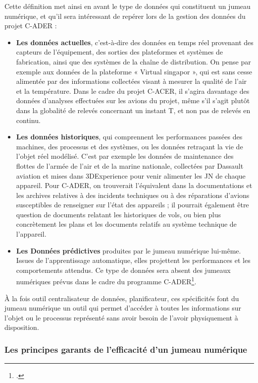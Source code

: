 Cette définition met ainsi en avant le type de données qui constituent un jumeau numérique, et qu'il sera intéressant de repérer lors de la gestion des données du projet C-ADER : 
\begin{itemize}
    \item \textbf{Les données actuelles}, c’est-à-dire des données en temps réel provenant des capteurs de l’équipement, des sorties des plateformes et systèmes de fabrication, ainsi que des systèmes de la chaîne de distribution. On pense par exemple aux données de la plateforme « Virtual singapor », qui est sans cesse alimentée par des informations collectées visant à mesurer la qualité de l’air et la température. Dans le cadre du projet C-ACER, il s’agira davantage des données d’analyses effectuées sur les avions du projet, même s’il s’agit plutôt dans la globalité de relevés concernant un instant T, et non pas de relevés en continu. 
    \item \textbf{Les données historiques}, qui comprennent les performances passées des machines, des processus et des systèmes, ou les données retraçant la vie de l’objet réel modélisé. C’est par exemple les données de maintenance des flottes de l’armée de l’air et de la marine nationale, collectées par Dassault aviation et mises dans 3DExperience pour venir alimenter les JN de chaque appareil. Pour C-ADER, on trouverait l’équivalent dans la documentations et les archives relatives à des incidents techniques ou à des réparations d’avions susceptibles de renseigner sur l’état des appareils ; il pourrait également être question de documents relatant les historiques de vols, ou bien plus concrètement les plans et les documents relatifs au système technique de l’appareil.
    \item \textbf{Les Données prédictives} produites par le jumeau numérique lui-même. Issues de l'apprentissage automatique, elles projettent les performances et les comportements attendus. Ce type de données sera absent des jumeaux numériques prévus dans le cadre du programme C-ADER\footcite{rebecchiQuEstceQue2021}.\\ 
\end{itemize}

À la fois outil centralisateur de données, planificateur, ces spécificités font du jumeau numérique un outil qui permet d'accéder à toutes les informations sur l'objet ou le processus représenté sans avoir besoin de l'avoir physiquement à disposition. 

        \subsubsection{Les principes garants de l'efficacité d'un jumeau numérique}

